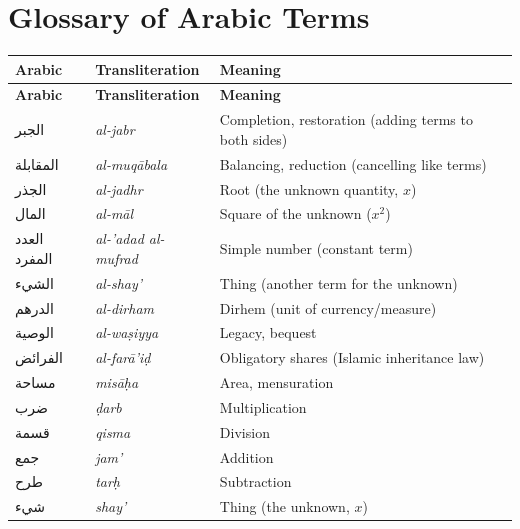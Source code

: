\documentclass[11pt,a4paper]{book}
\newcommand{\ar}[1]{{\arabicfont\beginR #1\endR}}
\begin{document}
\chapter{Glossary of Arabic Terms}
\label{app:glossary}

\begin{center}
\renewcommand{\arraystretch}{1.4}
\begin{longtable}{|l|l|l|}
\hline
\textbf{Arabic} & \textbf{Transliteration} & \textbf{Meaning} \\
\hline
\endfirsthead
\hline
\textbf{Arabic} & \textbf{Transliteration} & \textbf{Meaning} \\
\hline
\endhead
\hline
\endfoot
\ar{الجبر} & \textit{al-jabr} & Completion, restoration (adding terms to both sides) \\
\hline
\ar{المقابلة} & \textit{al-muq\=abala} & Balancing, reduction (cancelling like terms) \\
\hline
\ar{الجذر} & \textit{al-jadhr} & Root (the unknown quantity, $x$) \\
\hline
\ar{المال} & \textit{al-m\=al} & Square of the unknown ($x^2$) \\
\hline
\ar{العدد المفرد} & \textit{al-'adad al-mufrad} & Simple number (constant term) \\
\hline
\ar{الشيء} & \textit{al-shay'} & Thing (another term for the unknown) \\
\hline
\ar{الدرهم} & \textit{al-dirham} & Dirhem (unit of currency/measure) \\
\hline
\ar{الوصية} & \textit{al-wa\d{s}iyya} & Legacy, bequest \\
\hline
\ar{الفرائض} & \textit{al-far\=a'i\d{d}} & Obligatory shares (Islamic inheritance law) \\
\hline
\ar{مساحة} & \textit{mis\=a\d{h}a} & Area, mensuration \\
\hline
\ar{ضرب} & \textit{\d{d}arb} & Multiplication \\
\hline
\ar{قسمة} & \textit{qisma} & Division \\
\hline
\ar{جمع} & \textit{jam'} & Addition \\
\hline
\ar{طرح} & \textit{tar\d{h}} & Subtraction \\
\hline
\ar{شيء} & \textit{shay'} & Thing (the unknown, $x$) \\
\hline
\end{longtable}
\end{center}

\newpage

\end{document}
